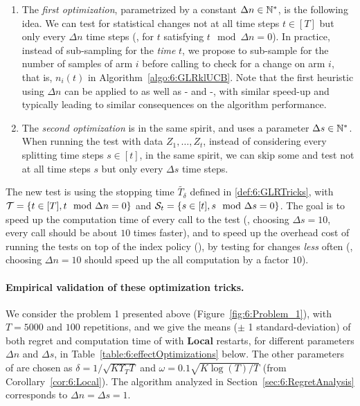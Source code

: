\begin{enumerate}
    \item
    The \emph{first optimization}, parametrized by a constant $\Delta n \in\mathbb{N}^*$, is the following idea.
    We can test for statistical changes not at all time steps $t\in[T]$ but only every $\Delta n$ time steps (\ie, for $t$ satisfying $t \mod \Delta n = 0$).
    In practice, instead of sub-sampling for the \emph{time} $t$, we propose to sub-sample for the number of samples of arm $i$ before calling \GLR{} to check for a change on arm $i$, that is, $n_i(t)$ in Algorithm~\ref{algo:6:GLRklUCB}.
    Note that the first heuristic using $\Delta n$ can be applied to \MUCB{} as well as \CUSUM-\UCB{} and \PHT-\UCB{}, with similar speed-up and typically leading to similar consequences on the algorithm performance.

    \item
    The \emph{second optimization} is in the same spirit, and uses a parameter $\Delta s \in\mathbb{N}^*$.
    When running the \GLR{} test with data $Z_1,\dots,Z_t$, instead of considering every splitting time steps $s\in[t]$, in the same spirit, we can skip some and test not at all time steps $s$ but only every $\Delta s$ time steps.
\end{enumerate}


The new \GLR{} test is using the stopping time $\widetilde{T_\delta}$ defined in \eqref{def:6:GLRTricks},
with $\mathcal{T} = \{t \in [T], t \mod \Delta n = 0\}$
and $\mathcal{S}_t = \{s \in [t], s \mod \Delta s = 0\}$.
The goal is to speed up the computation time of every call to the \GLR{} test (\eg, choosing $\Delta s = 10$, every call should be about $10$ times faster), and to speed up the overhead cost of running the tests on top of the index policy (\klUCB), by testing for changes \emph{less} often (\eg, choosing $\Delta n = 10$ should speed up the all computation by a factor $10$).


\paragraph{Empirical validation of these optimization tricks.}
%
We consider the problem 1 presented above (Figure~\ref{fig:6:Problem_1}), with $T=5000$ and $100$ repetitions, and we give the means ($\pm$ 1 standard-deviation) of both regret and computation time of \GLRklUCB{} with \textbf{Local} restarts, for different parameters $\Delta n$ and $\Delta s$, in Table~\ref{table:6:effectOptimizations} below.
The other parameters of \GLRklUCB{} are chosen as $\delta = 1/\sqrt{K \Upsilon_T T}$ and $\omega = 0.1\sqrt{K\log(T)/T}$ (from Corollary~\ref{cor:6:Local}).
The algorithm analyzed in Section~\ref{sec:6:RegretAnalysis} corresponds to $\Delta n = \Delta s = 1$.

